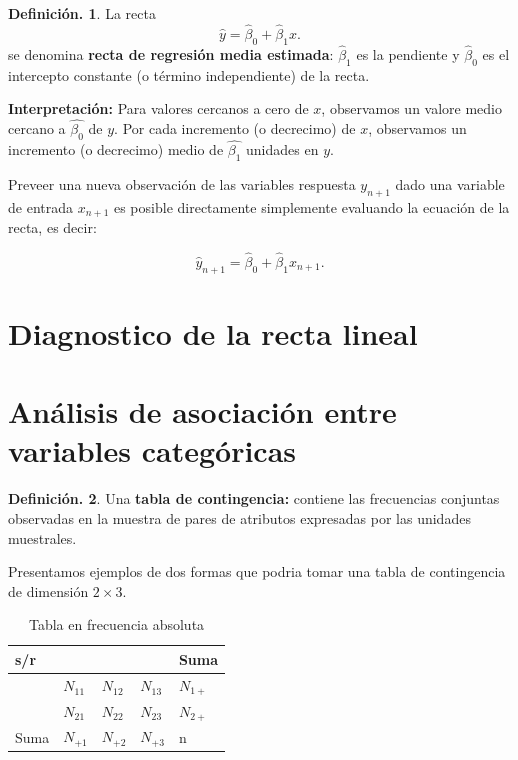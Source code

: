 \documentclass[]{book}
\theoremstyle{definition}
\newtheorem{definition}{Definición.}[chapter]
\theoremstyle{definition}
\theoremstyle{definition}
\theoremstyle{remark}
\begin{document}
\begin{definition}
\protect\hypertarget{def:unnamed-chunk-80}{}{\label{def:unnamed-chunk-80} }La recta
\[ \widehat{y} = \widehat{\beta}_0 +
\widehat{\beta}_1x.\]
se denomina \textbf{recta de regresión media estimada}:
\(\widehat{\beta}_1\) es la pendiente y
\(\widehat{\beta}_0\) es el
intercepto constante (o término independiente) de
la recta.
\end{definition}

\textbf{Interpretación:} Para valores cercanos a cero
de \(x\), observamos un valore medio cercano a
\(\widehat{\beta_0}\) de \(y\). Por cada incremento
(o decrecimo) de \(x\), observamos un incremento (o
decrecimo) medio de \(\widehat{\beta_1}\) unidades
en \(y\).

Preveer una nueva observación de las variables respuesta
\(y_{n+1}\) dado una variable de entrada \(x_{n+1}\) es
posible directamente simplemente evaluando la ecuación
de la recta, es decir:

\[ \widehat{y}_{n+1} = \widehat{\beta}_0 +
\widehat{\beta}_1x_{n+1}.
\]

\hypertarget{diagnostico-de-la-recta-lineal}{%
\section{Diagnostico de la recta lineal}\label{diagnostico-de-la-recta-lineal}}

\hypertarget{anuxe1lisis-de-asociaciuxf3n-entre-variables-categuxf3ricas}{%
\section{Análisis de asociación entre variables categóricas}\label{anuxe1lisis-de-asociaciuxf3n-entre-variables-categuxf3ricas}}

\begin{definition}
\protect\hypertarget{def:unnamed-chunk-81}{}{\label{def:unnamed-chunk-81} }Una \textbf{tabla de contingencia:} contiene las frecuencias
conjuntas observadas en la muestra de pares de atributos
expresadas por las unidades muestrales.
\end{definition}

Presentamos ejemplos de dos formas que podria tomar una
tabla de contingencia de dimensión \(2\times 3\).

\begin{table}[!htbp]
\centering
\caption{Tabla en frecuencia absoluta}
\label{mm}
\begin{tabular}{|l|l|l|l|l|}
\hline
s/r  &                 &  &  & \mbox{Suma}  \\ \hline
  &        $N_{11}$ & $N_{12}$  & $N_{13}$  & $N_{1+}$  \\ \hline
 &        $N_{21}$ & $N_{22}$  & $N_{23}$  &  $N_{2+}$ \\ \hline
\mbox{Suma} & $N_{+1}$ & $N_{+2}$ & $N_{+3}$  &  n \\ \hline
\end{tabular}
\end{table}
\end{document}
